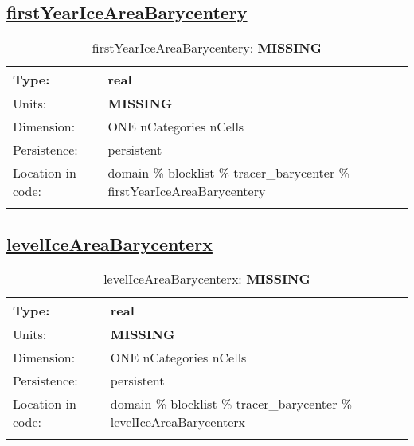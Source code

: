 \subsection[firstYearIceAreaBarycentery]{\hyperref[sec:var_tab_tracer_barycenter]{firstYearIceAreaBarycentery}}
\label{subsec:var_sec_tracer_barycenter_firstYearIceAreaBarycentery}
\begin{center}
\begin{longtable}{| p{2.0in} | p{4.0in} |}
        \hline 
        Type: & real \\
        \hline 
        Units: & {\bf \color{red} MISSING} \\
        \hline 
        Dimension: & ONE nCategories nCells \\
        \hline 
        Persistence: & persistent \\
        \hline 
         Location in code: & domain \% blocklist \% tracer\_barycenter \% firstYearIceAreaBarycentery \\
         \hline 
    \caption{firstYearIceAreaBarycentery: {\bf \color{red} MISSING}}
\end{longtable}
\end{center}
\subsection[levelIceAreaBarycenterx]{\hyperref[sec:var_tab_tracer_barycenter]{levelIceAreaBarycenterx}}
\label{subsec:var_sec_tracer_barycenter_levelIceAreaBarycenterx}
\begin{center}
\begin{longtable}{| p{2.0in} | p{4.0in} |}
        \hline 
        Type: & real \\
        \hline 
        Units: & {\bf \color{red} MISSING} \\
        \hline 
        Dimension: & ONE nCategories nCells \\
        \hline 
        Persistence: & persistent \\
        \hline 
         Location in code: & domain \% blocklist \% tracer\_barycenter \% levelIceAreaBarycenterx \\
         \hline 
    \caption{levelIceAreaBarycenterx: {\bf \color{red} MISSING}}
\end{longtable}
\end{center}
